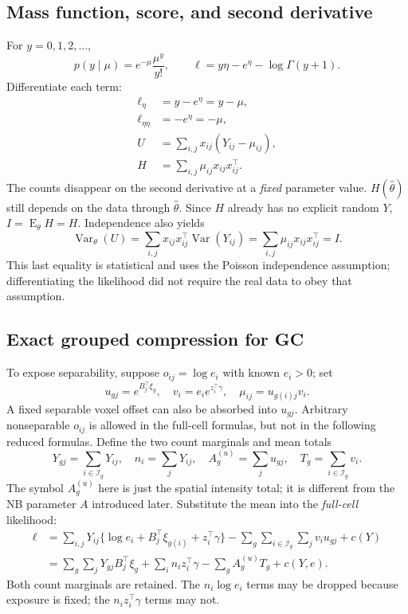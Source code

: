 \documentclass[11pt,a4paper]{article}
\newcommand{\E}{\operatorname{E}}
\newcommand{\Var}{\operatorname{Var}}
\numberwithin{equation}{section}
\begin{document}
\subsection{Mass function, score, and second derivative}
For $y=0,1,2,\ldots$,
\[
 p(y\mid\mu)=e^{-\mu}\frac{\mu^y}{y!},\qquad
 \ell=y\eta-e^\eta-\log\Gamma(y+1).
\]
Differentiate each term:
\begin{align}
 \ell_\eta&=y-e^\eta=y-\mu,\\
 \ell_{\eta\eta}&=-e^\eta=-\mu,\\
 U&=\sum_{i,j}x_{ij}(Y_{ij}-\mu_{ij}),\\
 H&=\sum_{i,j}\mu_{ij}x_{ij}x_{ij}^\top.
 \label{eq:poisson-information}
\end{align}
The counts disappear on the second derivative at a \emph{fixed}
parameter value. $H(\widehat\theta)$ still depends on the data through
$\widehat\theta$. Since $H$ already has no explicit random $Y$,
$I=\E_\theta H=H$.
Independence also yields
\[
 \Var_\theta(U)=\sum_{i,j}x_{ij}x_{ij}^\top\Var(Y_{ij})
 =\sum_{i,j}\mu_{ij}x_{ij}x_{ij}^\top=I.
\]
This last equality is statistical and uses the Poisson independence
assumption; differentiating the likelihood did not require the real
data to obey that assumption.

\subsection{Exact grouped compression for GC}
To expose separability, suppose $o_{ij}=\log e_i$ with known $e_i>0$;
set
\[
 u_{gj}=e^{B_j^\top\xi_g},\quad
 v_i=e_i e^{z_i^\top\gamma},\quad
 \mu_{ij}=u_{g(i)j}v_i.
\]
A fixed separable voxel offset can also be absorbed into $u_{gj}$.
Arbitrary nonseparable $o_{ij}$ is allowed in the full-cell formulas,
but not in the following reduced formulas.
Define the two count marginals and mean totals
\[
 Y_{gj}=\sum_{i\in\mathcal I_g}Y_{ij},\quad
 n_i=\sum_jY_{ij},\quad
 A_g^{(u)}=\sum_j u_{gj},\quad T_g=\sum_{i\in\mathcal I_g}v_i.
\]
The symbol $A_g^{(u)}$ here is just the spatial intensity total;
it is different from the NB parameter $A$ introduced later.
Substitute the mean into the \emph{full-cell} likelihood:
\begin{align}
 \ell
 &=\sum_{i,j}Y_{ij}
    \{\log e_i+B_j^\top\xi_{g(i)}+z_i^\top\gamma\}
       -\sum_{g}\sum_{i\in\mathcal I_g}\sum_jv_i u_{gj}
       +c(Y)\\
 &=\sum_g\sum_jY_{gj}B_j^\top\xi_g
     +\sum_i n_i z_i^\top\gamma
     -\sum_g A_g^{(u)}T_g+c(Y,e).
 \label{eq:poisson-compression}
\end{align}
Both count marginals are retained. The $n_i\log e_i$ terms may be
dropped because exposure is fixed; the $n_i z_i^\top\gamma$ terms may not.
\end{document}
